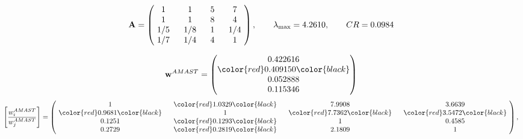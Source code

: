 \begin{example}
\begin{equation*}
\mathbf{A} =
\begin{pmatrix}
$\,\,$ 1 $\,\,$ & $\,\,$1$\,\,$ & $\,\,$5$\,\,$ & $\,\,$7 $\,\,$ \\
$\,\,$ 1 $\,\,$ & $\,\,$ 1 $\,\,$ & $\,\,$8$\,\,$ & $\,\,$4 $\,\,$ \\
$\,\,$ 1/5$\,\,$ & $\,\,$ 1/8$\,\,$ & $\,\,$ 1 $\,\,$ & $\,\,$ 1/4 $\,\,$ \\
$\,\,$ 1/7$\,\,$ & $\,\,$ 1/4$\,\,$ & $\,\,$4$\,\,$ & $\,\,$ 1  $\,\,$ \\
\end{pmatrix},
\qquad
\lambda_{\max} =
4.2610,
\qquad
CR = 0.0984
\end{equation*}

\begin{equation*}
\mathbf{w}^{AMAST} =
\begin{pmatrix}
0.422616\\
\color{red} 0.409150\color{black} \\
0.052888\\
0.115346
\end{pmatrix}\end{equation*}
\begin{equation*}
\left[ \frac{{w}^{AMAST}_i}{{w}^{AMAST}_j} \right] =
\begin{pmatrix}
$\,\,$ 1 $\,\,$ & $\,\,$\color{red} 1.0329\color{black} $\,\,$ & $\,\,$7.9908$\,\,$ & $\,\,$3.6639$\,\,$ \\
$\,\,$\color{red} 0.9681\color{black} $\,\,$ & $\,\,$ 1 $\,\,$ & $\,\,$\color{red} 7.7362\color{black} $\,\,$ & $\,\,$\color{red} 3.5472\color{black}   $\,\,$ \\
$\,\,$0.1251$\,\,$ & $\,\,$\color{red} 0.1293\color{black} $\,\,$ & $\,\,$ 1 $\,\,$ & $\,\,$0.4585 $\,\,$ \\
$\,\,$0.2729$\,\,$ & $\,\,$\color{red} 0.2819\color{black} $\,\,$ & $\,\,$2.1809$\,\,$ & $\,\,$ 1  $\,\,$ \\
\end{pmatrix},
\end{equation*}


\end{example}
